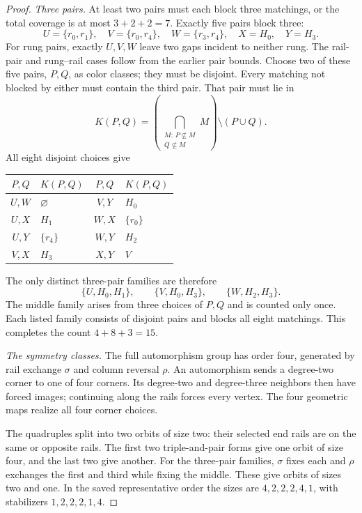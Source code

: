 \documentclass[11pt,letterpaper]{article}
\begin{document}
\begin{proof}
\newpage
\noindent\emph{Three pairs.}
At least two pairs must each block three matchings, or the total coverage
is at most $3+2+2=7$. Exactly five pairs block three:
\[
 U=\{r_0,r_1\},\quad V=\{r_0,r_4\},\quad W=\{r_3,r_4\},
 \quad X=H_0,\quad Y=H_3 .
\]
For rung pairs, exactly $U,V,W$ leave two gaps incident to neither rung.
The rail-pair and rung--rail cases follow from the earlier pair bounds.
Choose two of these five pairs, $P,Q$, as color classes; they must be
disjoint. Every matching not blocked by either must contain the third
pair. That pair must lie in
\[
 K(P,Q)=
 \left(\bigcap_{\substack{M:\,P\nsubseteq M\\Q\nsubseteq M}}M\right)
 \setminus(P\cup Q).
\]
All eight disjoint choices give
\begin{center}\small
\begin{tabular}{cl@{\qquad}cl}
\toprule
$P,Q$ & $K(P,Q)$ & $P,Q$ & $K(P,Q)$\\
\midrule
$U,W$ & $\varnothing$ & $V,Y$ & $H_0$\\
$U,X$ & $H_1$ & $W,X$ & $\{r_0\}$\\
$U,Y$ & $\{r_4\}$ & $W,Y$ & $H_2$\\
$V,X$ & $H_3$ & $X,Y$ & $V$\\
\bottomrule
\end{tabular}
\end{center}
The only distinct three-pair families are therefore
\[
 \{U,H_0,H_1\},\qquad
 \{V,H_0,H_3\},\qquad
 \{W,H_2,H_3\}.
\]
The middle family arises from three choices of $P,Q$ and is counted only
once. Each listed family consists of disjoint pairs and blocks all eight
matchings. This completes the count $4+8+3=15$.

\medskip\noindent\emph{The symmetry classes.}
The full automorphism group has order four, generated by rail exchange
$\sigma$ and column reversal $\rho$. An automorphism sends a degree-two
corner to one of four corners. Its degree-two and degree-three neighbors
then have forced images; continuing along the rails forces every vertex.
The four geometric maps realize all four corner choices.

The quadruples split into two orbits of size two: their selected end rails
are on the same or opposite rails. The first two triple-and-pair forms
give one orbit of size four, and the last two give another.
For the three-pair families, $\sigma$ fixes each and $\rho$ exchanges
the first and third while fixing the middle. These give orbits of sizes
two and one. In the saved representative order the sizes are
$4,2,2,2,4,1$, with stabilizers $1,2,2,2,1,4$.
\end{proof}
\end{document}
